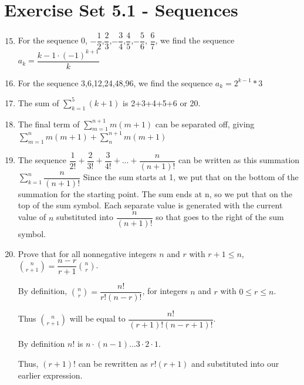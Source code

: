 \documentclass[12pt]{article}
\begin{document}
\setcounter{section}{5}
\section*{Exercise Set 5.1 - Sequences}
\begin{enumerate}
  \setcounter{enumi}{14}
\item %
For the sequence 0, $-
\dfrac{1}{2}$,$\dfrac{2}{3}$,$-\dfrac{3}{4}$,$\dfrac{4}{5}$,$-\dfrac{5}{6}$,
$\dfrac{6}{7}$, we find the sequence $a_{k} = \dfrac{k-1 \cdot (-1)^{k+1}  }{k}$
\item %
For the sequence 3,6,12,24,48,96, we find the sequence $a_{k} =
2^{k-1} * 3$
  \setcounter{enumi}{18}
\item %
The sum of $\displaystyle\sum_{k=1}^{5}(k+1)$ is 2+3+4+5+6 or 20.
  \setcounter{enumi}{38}
\item %
The final term of $\displaystyle\sum_{m=1}^{n+1}m(m+1)$ can be
separated off, giving $\displaystyle\sum_{m=1}^{n}m(m+1) + \displaystyle\sum_{n}^{n+1}m(m+1)$
  \setcounter{enumi}{49}
\item %

  The sequence $\dfrac{1}{2!} + \dfrac{2}{3!} + \dfrac{3}{4!} + ... + \dfrac{n}{(n+1)!}$ can be written as
  this summation $\displaystyle\sum_{k=1}^{n}\dfrac{n}{(n+1)!}$ Since the sum starts at 1, we put that on the
  bottom of the summation for the starting point. The sum ends at n, so we put that on the top of the sum
  symbol. Each separate value is generated with the current value of $n$ substituted into $\dfrac{n}{(n+1)!}$
  so that goes to the right of the sum symbol.

  \setcounter{enumi}{77}
\item %

  Prove that for all nonnegative integers $n$ and $r$ with $r + 1 \leq n$, $\displaystyle{n \choose r + 1} =
  \dfrac{n - r}{r+1}\displaystyle{n \choose r}$.

  By definition, $\displaystyle{n \choose r} = \dfrac{n!}{r!(n - r)!}$, for integers $n$ and $r$ with $0 \leq
  r \leq n$.

Thus $\displaystyle{n \choose r + 1}$ will be equal to $\dfrac{n!}{(r+1)!(n - r+1)!}$.
  
By definition $n!$ is $n \cdot (n - 1) \ldots 3 \cdot 2 \cdot 1$.

Thus, $(r+1)!$ can be rewritten as $r!(r +1)$ and substituted into our earlier expression.


\end{enumerate}
\end{document}

